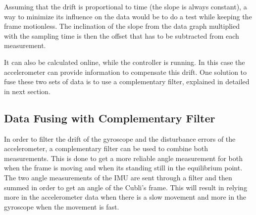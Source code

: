 Assuming that the drift is proportional to time (the slope is always constant), a way to minimize its influence on the data would be to do a test while keeping the frame motionless. The inclination of the slope from the data graph multiplied with the sampling time is then the offset that has to be subtracted from each measurement.

It can also be calculated online, while the controller is running. In this case the accelerometer can provide information to compensate this drift. One solution to fuse these two sets of data is to use a complementary filter, explained in detailed in next section.

\subsection{Data Fusing with Complementary Filter}
In order to filter the drift of the gyroscope and the disturbance errors of the accelerometer, a complementary filter can be used to combine both measurements. This is done to get a more reliable angle measurement for both when the frame is moving and when its standing still in the equilibrium point.\\
The two angle measurements of the IMU are sent through a filter and then summed in order to get an angle of the Cubli's frame. This will result in relying more in the accelerometer data when there is a slow movement and more in the gyroscope when the movement is fast.\cite{PGui}

